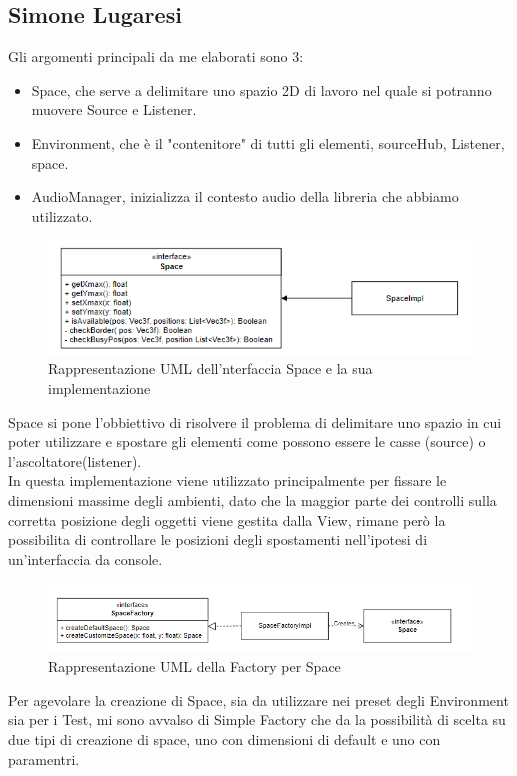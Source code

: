 \documentclass[a4paper,12pt]{report}
\begin{document}
\subsection*{Simone Lugaresi}
Gli argomenti principali da me elaborati sono 3:
\begin{itemize}
	\item Space, che serve a delimitare uno spazio 2D di lavoro nel quale si potranno muovere Source e Listener.
	\item Environment, che è il "contenitore" di tutti gli elementi, sourceHub, Listener, space.
	\item AudioManager, inizializza il contesto audio della libreria che abbiamo utilizzato.
\end{itemize}

\begin{figure}[H]
\centering{}
\includegraphics[width=\textwidth]{img/space/Space.png}
\caption{Rappresentazione UML dell'nterfaccia Space e la sua implementazione}
\label{img:space}
\end{figure}
Space si pone l'obbiettivo di risolvere il problema di delimitare uno spazio in cui poter utilizzare e spostare gli elementi come possono essere le casse (source) o l'ascoltatore(listener). \\In questa implementazione viene utilizzato principalmente per fissare le dimensioni massime degli ambienti, dato che la maggior parte dei controlli sulla corretta posizione degli oggetti viene gestita dalla View, rimane però la possibilita di controllare le posizioni degli spostamenti nell'ipotesi di un'interfaccia da console.
%
\begin{figure}[H]
\centering{}
\includegraphics[width=\textwidth]{img/space/SpaceFactory.png}
\caption{Rappresentazione UML della Factory per Space}
\label{img:spacefactory}
\end{figure}
Per agevolare la creazione di Space, sia da utilizzare nei preset degli Environment sia per i Test, mi sono avvalso di Simple Factory che da la possibilità di scelta su due tipi di creazione di space, uno con dimensioni di default e uno con paramentri.
\end{document}
